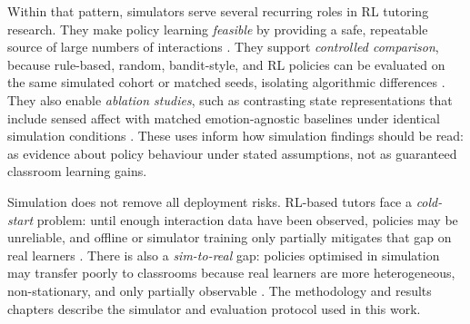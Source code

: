 Within that pattern, simulators serve several recurring roles in RL tutoring research. They make policy learning \emph{feasible} by providing a safe, repeatable source of large numbers of interactions \cite{azoulay_adaptive_2021,deshmukh_developing_2025}. They support \emph{controlled comparison}, because rule-based, random, bandit-style, and RL policies can be evaluated on the same simulated cohort or matched seeds, isolating algorithmic differences \cite{azoulay_adaptive_2021,axak_adaptive_nodate,weitekamp_tutorgym_2025}. They also enable \emph{ablation studies}, such as contrasting state representations that include sensed affect with matched emotion-agnostic baselines under identical simulation conditions \cite{weitekamp_tutorgym_2025,perez_emotions_2024}. These uses inform how simulation findings should be read: as evidence about policy behaviour under stated assumptions, not as guaranteed classroom learning gains.

Simulation does not remove all deployment risks. RL-based tutors face a \emph{cold-start} problem: until enough interaction data have been observed, policies may be unreliable, and offline or simulator training only partially mitigates that gap on real learners \cite{sutton_rl_book_2018,axak_adaptive_nodate}. There is also a \emph{sim-to-real} gap: policies optimised in simulation may transfer poorly to classrooms because real learners are more heterogeneous, non-stationary, and only partially observable \cite{urbaite_adaptive_2026,azoulay_adaptive_2021}. The methodology and results chapters describe the simulator and evaluation protocol used in this work.
